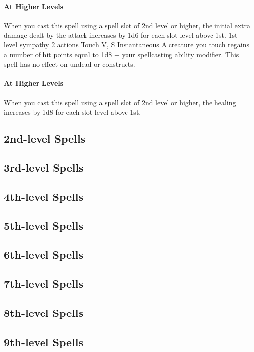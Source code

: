         \paragraph{At Higher Levels}
        When you cast this spell using a spell slot of 2nd level or higher, the initial extra damage dealt by the attack increases by 1d6 for each slot level above 1st.
        {1st-level sympathy}
        {2 actions}
        {Touch}
        {V, S}
        {Instantaneous}
        A creature you touch regains a number of hit points equal to 1d8 + your spellcasting ability modifier.
        This spell has no effect on undead or constructs.

        \paragraph{At Higher Levels}
        When you cast this spell using a spell slot of 2nd level or higher, the healing increases by 1d8 for each slot level above 1st.
\subsection*{2nd-level Spells}
\subsection*{3rd-level Spells}
\subsection*{4th-level Spells}
\subsection*{5th-level Spells}
\subsection*{6th-level Spells}
\subsection*{7th-level Spells}
\subsection*{8th-level Spells}
\subsection*{9th-level Spells}
